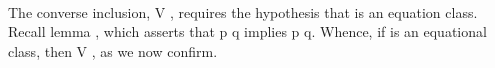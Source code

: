 \begin{code}
\>[2]\AgdaSpace{}%
\AgdaSymbol{=}\AgdaSpace{}%
\AgdaSpace{}%
\AgdaSymbol{(}\AgdaSpace{}%
\AgdaOperator{\AgdaInductiveConstructor{,}}\AgdaSpace{}%
\AgdaSpace{}%
\AgdaSymbol{)}\AgdaSpace{}%
\AgdaSymbol{(}\AgdaSpace{}%
\AgdaOperator{\AgdaInductiveConstructor{,}}\AgdaSpace{}%
\AgdaSpace{}%
\AgdaSymbol{)}\AgdaSpace{}%
\AgdaSpace{}%
\AgdaBound{\AgdaUnderscore{}}\AgdaSpace{}%
\AgdaBound{\AgdaUnderscore{}}\AgdaSpace{}%
\AgdaSpace{}%
\AgdaSymbol{)}\AgdaSpace{}%
\AgdaSpace{}%
\AgdaBound{\AgdaUnderscore{}}\AgdaSpace{}%
\AgdaSpace{}%
\AgdaSymbol{)}\<%
\\
\>[0]\<%
\end{code}

The converse inclusion, \af V   , requires the
hypothesis that  is an equation class. Recall lemma
, which asserts that   \ab p  \ab q implies 
    \ab p  \ab q. Whence, if  is an equational
class, then \af V   , as we now confirm.


